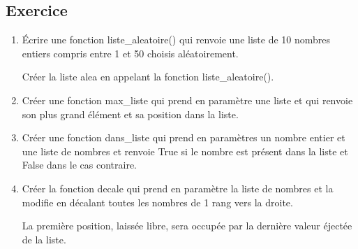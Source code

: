\documentclass[11pt,a4paper]{article}
\newcounter{numexo}
\begin{document}
\subsection*{\Large Exercice \thenumexo}
\begin{enumerate}
\item Écrire une fonction \textsf{liste\_aleatoire()} qui renvoie une liste de 10 nombres entiers compris entre 1 et 50 choisis aléatoirement.

Créer la liste \textsf{alea} en appelant la fonction \textsf{liste\_aleatoire()}.

\item Créer une fonction \textsf{max\_liste} qui prend en paramètre une liste et qui renvoie son plus grand élément et sa position dans la liste.

\item Créer une fonction \textsf{dans\_liste} qui prend en paramètres un nombre entier et une liste de nombres et renvoie \textsf{True} si le nombre est présent dans la liste et \textsf{False} dans le cas contraire.


\item Créer la fonction \textsf{decale} qui prend en paramètre la liste de nombres et la modifie en décalant toutes les nombres de 1 rang vers la droite.

La première position, laissée libre, sera occupée par la dernière valeur éjectée de la liste.  
\end{enumerate}
\end{document}

